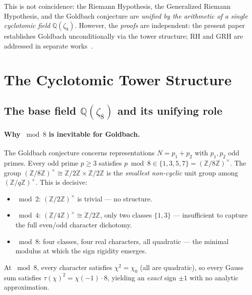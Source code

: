 \documentclass[11pt,a4paper]{article}
\theoremstyle{remark}
\newcommand{\Z}{\mathbb{Z}}
\newcommand{\Q}{\mathbb{Q}}
\begin{document}
This is not coincidence: the Riemann Hypothesis, the Generalized Riemann
Hypothesis, and the Goldbach conjecture are \emph{unified by the
arithmetic of a single cyclotomic field} $\Q(\zeta_8)$.  However, the
\emph{proofs} are independent: the present paper establishes Goldbach
unconditionally via the tower structure; RH and GRH are addressed in
separate works~\cite{Chen2026RH,Chen2026GRH}.

\section{The Cyclotomic Tower Structure}
\label{sec:tower}

\subsection{The base field $\Q(\zeta_8)$ and its unifying role}
\label{subsec:why-zeta8}

\paragraph{Why $\bmod 8$ is inevitable for Goldbach.}
The Goldbach conjecture concerns representations $N = p_1 + p_2$
with $p_1, p_2$ odd primes.  Every odd prime $p \geq 3$ satisfies
$p \bmod 8 \in \{1, 3, 5, 7\} = (\Z/8\Z)^\times$.
The group $(\Z/8\Z)^\times \cong \Z/2\Z \times \Z/2\Z$ is the
\emph{smallest non-cyclic} unit group among $(\Z/q\Z)^\times$.
This is decisive:
\begin{itemize}[nosep]
  \item $\bmod 2$: $(\Z/2\Z)^\times$ is trivial --- no structure.
  \item $\bmod 4$: $(\Z/4\Z)^\times \cong \Z/2\Z$, only two classes
    $\{1,3\}$ --- insufficient to capture the full even/odd character
    dichotomy.
  \item $\bmod 8$: four classes, four real characters, all quadratic ---
    the minimal modulus at which the sign rigidity emerges.
\end{itemize}
At $\bmod 8$, every character satisfies $\chi^2 = \chi_0$ (all are
quadratic), so every Gauss sum satisfies $\tau(\chi)^2 = \chi(-1) \cdot 8$,
yielding an \emph{exact} sign $\pm 1$ with no analytic approximation.
\end{document}
